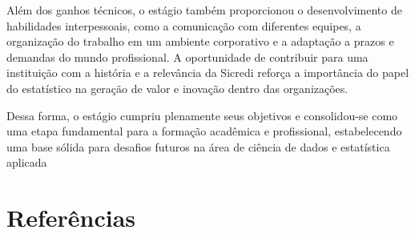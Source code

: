 \documentclass[
  12pt,
  a4paper,
]{scrreprt}
\begin{document}
\vspace{12pt}

Além dos ganhos técnicos, o estágio também proporcionou o
desenvolvimento de habilidades interpessoais, como a comunicação com
diferentes equipes, a organização do trabalho em um ambiente corporativo
e a adaptação a prazos e demandas do mundo profissional. A oportunidade
de contribuir para uma instituição com a história e a relevância da
Sicredi reforça a importância do papel do estatístico na geração de
valor e inovação dentro das organizações.

\vspace{12pt}

Dessa forma, o estágio cumpriu plenamente seus objetivos e consolidou-se
como uma etapa fundamental para a formação acadêmica e profissional,
estabelecendo uma base sólida para desafios futuros na área de ciência
de dados e estatística aplicada

\chapter*{\texorpdfstring{\centering Referências}{Referências}}\label{referuxeancias}

\end{document}
